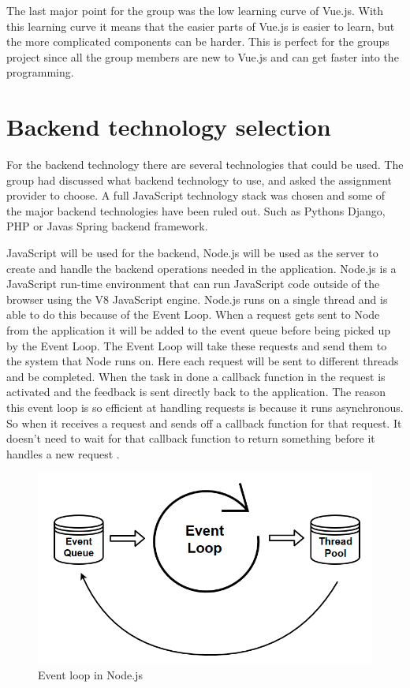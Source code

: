 The last major point for the group was the low learning curve of Vue.js. With this learning curve it means that the easier parts of Vue.js is easier to learn, but the more complicated components can be harder. This is perfect for the groups project since all the group members are new to Vue.js and can get faster into the programming.

\section{Backend technology selection}
For the backend technology there are several technologies that could be used. The group had discussed what backend technology to use, and asked the assignment provider to choose. A full JavaScript technology stack was chosen and some of the major backend technologies have been ruled out. Such as Pythons Django, PHP or Javas Spring backend framework. 

JavaScript will be used for the backend, Node.js will be used as the server to create and handle the backend operations needed in the application. Node.js is a JavaScript run-time environment that can run JavaScript code outside of the browser using the V8 JavaScript engine. Node.js runs on a single thread and is able to do this because of the Event Loop. When a request gets sent to Node from the application it will be added to the event queue before being picked up by the Event Loop. The Event Loop will take these requests and send them to the system that Node runs on. Here each request will be sent to different threads and be completed. When the task in done a callback function in the request is activated and the feedback is sent directly back to the application. The reason this event loop is so efficient at handling requests is because it runs asynchronous. So when it receives a request and sends off a callback function for that request. It doesn't need to wait for that callback function to return something before it handles a new request \cite{Node-event-loop}.

\begin{figure}
    \centering
    \includegraphics[width=115mm,scale=1]{figures/event_loop.png}
    \caption{Event loop in Node.js}
    \label{fig:Node_Event_Loop}
\end{figure}

